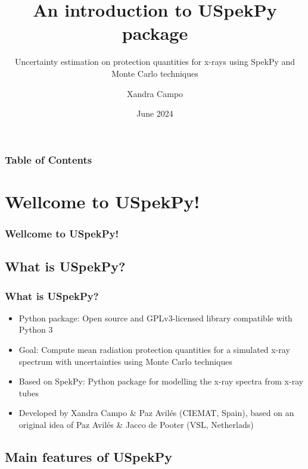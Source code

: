 \documentclass{beamer}
\title{An introduction to USpekPy package}
\subtitle{Uncertainty estimation on protection quantities for x-rays using SpekPy and Monte Carlo techniques}
\author[X. Campo]{Xandra Campo}
\institute[LMRI-CIEMAT]{Ionizing Radiation Metrology Laboratory (LMRI) \newline CIEMAT, Spain}
\date{June 2024}
\newcommand{\highlight}[1]{{\color{blue} #1}}
\begin{document}
	
	\maketitle
	
	\begin{frame}
		\frametitle{Table of Contents}
		\tableofcontents[hideallsubsections]
		\centering
		\href{https://forms.gle/uCHj4XH5BJTBqjiQ9}{}
	\end{frame}
	
	
	\section{Wellcome to USpekPy!}
	
	\begin{frame}
		\frametitle{Wellcome to USpekPy!}
		\tableofcontents[
		currentsection,
		sectionstyle=show/shaded,
		subsectionstyle=show/show/hide
		]
	\end{frame}
	
	\subsection{What is USpekPy?}
	
	\begin{frame}
		\frametitle{What is USpekPy?}
		\begin{itemize}
			\setlength\itemsep{1em}
			\item \highlight{Python package}: Open source and GPLv3-licensed library compatible with Python 3
			\href{https://github.com/lmri-met/uspekpy}{\beamergotobutton{Go}}
			\item \highlight{Goal}: Compute mean radiation protection quantities for a simulated x-ray spectrum with uncertainties using Monte Carlo techniques
			\item Based on \highlight{SpekPy}: Python package for modelling the x-ray spectra from x-ray tubes
			\href{https://bitbucket.org/spekpy/spekpy_release/wiki/Home}{\beamergotobutton{Go}}
			\item \highlight{Developed} by Xandra Campo \& Paz Avilés (CIEMAT, Spain), based on an \highlight{original idea} of Paz Avilés \& Jacco de Pooter (VSL, Netherlads)
		\end{itemize}	
	\end{frame}
	
	\subsection{Main features of USpekPy}
	
\end{document}
